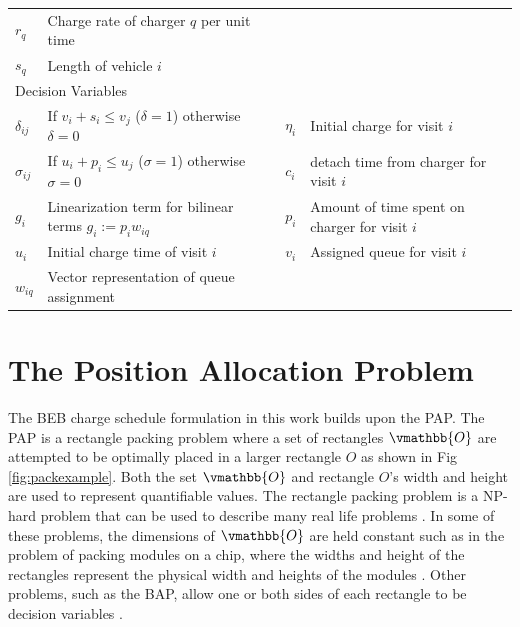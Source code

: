 \documentclass[letterpaper, 10pt, conference]{IEEEtran}
\begin{document}
\begin{table}[!t]
\begin{tabular}{l l l l}
			$r_q$        & Charge rate of charger $q$ per unit time                        \\
			$s_q$        & Length of vehicle \(i\)                                         \\
		\hline
		\multicolumn{4}{l}{Decision Variables} \\
			$\delta_{ij}$ & If $v_i + s_i \leq v_j$ (\(\delta = 1\)) otherwise \(\delta = 0\)   &
			$\eta_i$      & Initial charge for visit $i$                                        \\
			$\sigma_{ij}$ & If \(u_i + p_i \leq u_j\) (\(\sigma = 1\)) otherwise \(\sigma = 0\) &
			$c_i$         & detach time from charger for visit $i$                              \\
			$g_i$         & Linearization term for bilinear terms $g_i := p_i w_{iq}$           &
			$p_i$         & Amount of time spent on charger for visit $i$                       \\
			$u_i$         & Initial charge time of visit $i$                                    &
			$v_i$         & Assigned queue for visit $i$                                        \\
			$w_{iq}$      & Vector representation of queue assignment                           \\
			\bottomrule
	\end{tabular}
\end{table}

\section{The Position Allocation Problem}
\label{sec:positionallocationproblem}
The BEB charge schedule formulation in this work builds upon the PAP. The PAP is a rectangle packing problem where a set of rectangles \(\vmathbb{O}\) are attempted to be optimally placed in a larger rectangle \(O\) as shown in Fig \ref{fig:packexample}. Both the set \(\vmathbb{O}\) and rectangle \(O\)'s width and height are used to represent quantifiable values. The rectangle packing problem is a NP-hard problem that can be used to describe many real life problems \cite{Bruin2013,Murata1995}. In some of these problems, the dimensions of \(\vmathbb{O}\) are held constant such as in the problem of packing modules on a chip, where the widths and height of the rectangles represent the physical width and heights of the modules \cite{Murata1995}. Other problems, such as the BAP, allow one or both sides of each rectangle to be decision variables \cite{Buhrkal2010}.
\end{document}
